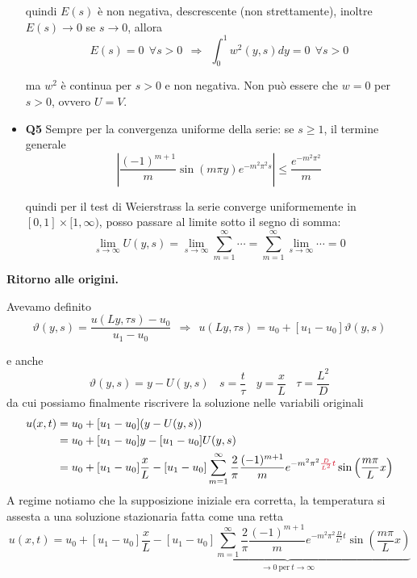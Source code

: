 \documentclass[10pt,a4paper,twoside,openright]{book}
\begin{document}
\begin{itemize}
quindi $E(s)$ è non negativa, descrescente (non strettamente), inoltre $E(s)\rightarrow 0$ se $s\rightarrow 0$, allora\begin{equation*}
E(s) =0\ \ \forall s >0\ \ \Rightarrow \ \ \int ^{1}_{0} w^{2}(y,s) dy=0\ \ \forall s >0
\end{equation*}

ma $w^{2}$ è continua per $s >0$ e non negativa. Non può essere che $w=0$ per $s >0$, ovvero $U=V$.
\item \textbf{Q5} Sempre per la convergenza uniforme della serie: se $\displaystyle s\geqslant 1$, il termine generale \begin{equation*}
\left| \frac{(-1)^{m+1}}{m}\sin(m\pi y) e^{-m^{2} \pi ^{2} s}\right| \leqslant \frac{e^{-m^{2} \pi ^{2}}}{m}
\end{equation*}

quindi per il test di Weierstrass la serie converge uniformemente in $\displaystyle [ 0,1] \times [ 1,\infty)$, posso passare al limite sotto il segno di somma:
\begin{equation*}
	\lim_{s \to \infty} U(y,s) = \lim_{s \to \infty} \sum\limits ^{\infty }_{m=1}\cdots = \sum\limits ^{\infty }_{m=1} \lim_{s \to \infty} \cdots = 0
\end{equation*}
\end{itemize}



\textbf{Ritorno alle origini.}

Avevamo definito
\begin{equation*}
\vartheta(y,s) =\frac{u(Ly,\tau s) -u_{0}}{u_{1} -u_{0}} \ \ \Rightarrow \ \ u(Ly,\tau s) =u_{0} +[ u_{1} -u_{0}] \vartheta(y,s)
\end{equation*}

e anche
\begin{equation*}
\vartheta(y,s) =y-U(y,s) \ \ \ \ s=\frac{t}{\tau } \ \ \ \ y=\frac{x}{L} \ \ \ \ \tau =\frac{L^{2}}{D}
\end{equation*}
da cui possiamo finalmente riscrivere la soluzione nelle variabili originali
\begin{align*}
u(x,t) & =u_{0} +[ u_{1} -u_{0}](y-U(y,s))\\
 & =u_{0} +[ u_{1} -u_{0}] y-[ u_{1} -u_{0}] U(y,s)\\
 & =u_{0} +[ u_{1} -u_{0}]\frac{x}{L} -[ u_{1} -u_{0}]\sum\limits ^{\infty }_{m=1}\frac{2}{\pi }\frac{(-1)^{m+1}}{m} e^{-m^{2} \pi ^{2}\textcolor[rgb]{0.82,0.01,0.11}{\frac{D}{L^{2}}}\textcolor[rgb]{0.82,0.01,0.11}{t}}\sin\left(\frac{m\pi }{L} x\right)
\end{align*}
A regime notiamo che la supposizione iniziale era corretta, la temperatura si assesta a una soluzione stazionaria fatta come una retta
\begin{equation*}
u(x,t) =u_{0} +[ u_{1} -u_{0}]\frac{x}{L} -\underbrace{[ u_{1} -u_{0}]\sum\limits ^{\infty }_{m=1}\frac{2}{\pi }\frac{(-1)^{m+1}}{m} e^{-m^{2} \pi ^{2}\frac{D}{L^{2}} t}\sin\left(\frac{m\pi }{L} x\right)}_{\rightarrow 0\ \text{per} \ t\rightarrow \infty }
\end{equation*}
\end{document}
